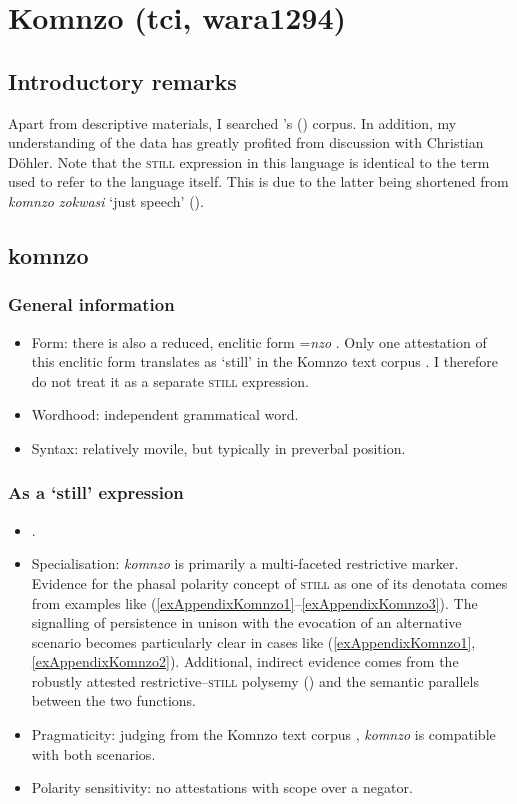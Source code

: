 \largerpage
\section{Komnzo (tci, wara1294)}
\label{appendixKomnzo}

\subsection{Introductory remarks}
Apart from descriptive materials, I searched \citeauthor{Doehler2020}'s (\citeyear{Doehler2020}) corpus. In addition, my understanding of the data has greatly profited from discussion with Christian Döhler. Note that the \textsc{still} expression in this language is identical to the term used to refer to the language itself. This is due to the latter being shortened from \textit{komnzo zokwasi} \lq just speech' (\cite[1]{Doehler2018}).

\subsection{komnzo}
\subsubsection{General information}
\begin{itemize}
	\item Form: there is also a reduced, enclitic form \mbox{=\textit{nzo}} \parencite[169–170]{Doehler2018}. Only one attestation of this enclitic form translates as \lq still' in the Komnzo text corpus \parencite{Doehler2020}. I therefore do not treat it as a separate \textsc{still} expression.
	\item Wordhood: independent grammatical word.
	\item Syntax: relatively movile, but typically in preverbal position.
\end{itemize}

\subsubsection{As a \lq{}still\rq{ }expression}
\begin{itemize}
	\item \textcite[125–126]{Doehler2018}.
	\item Specialisation: \textit{komnzo} is primarily a multi-faceted restrictive marker. Evidence for the phasal polarity concept of \textsc{still} as one of its denotata comes from examples like (\ref{exAppendixKomnzo1}–\ref{exAppendixKomnzo3}). The signalling of persistence in unison with the evocation of an alternative scenario becomes particularly clear in cases like (\ref{exAppendixKomnzo1}, \ref{exAppendixKomnzo2}). Additional, indirect evidence comes from the robustly attested restrictive–\textsc{still} polysemy () and the semantic parallels between the two functions.
	\item Pragmaticity: judging from the Komnzo text corpus \parencite{Doehler2020}, \textit{komnzo} is compatible with both scenarios.
	\item Polarity sensitivity: no attestations with scope over a negator.
\end{itemize}


